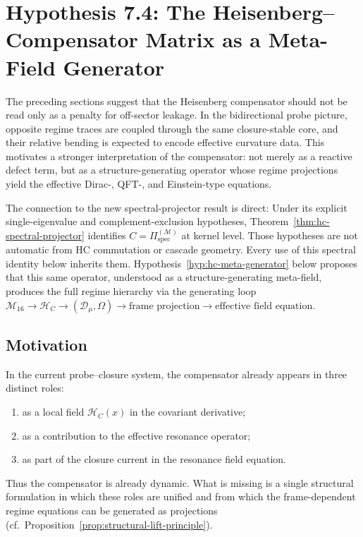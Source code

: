 \section{Hypothesis 7.4: The Heisenberg--Compensator Matrix as a Meta-Field Generator}
\label{sec:hc-meta-field-generator}

The preceding sections suggest that the Heisenberg compensator should not
be read only as a penalty for off-sector leakage. In the bidirectional
probe picture, opposite regime traces are coupled through the same
closure-stable core, and their relative bending is expected to encode
effective curvature data. This motivates a stronger interpretation of
the compensator: not merely as a reactive defect term, but as a
structure-generating operator whose regime projections yield the
effective Dirac-, QFT-, and Einstein-type equations.

The connection to the new spectral-projector result is direct:
Under its explicit single-eigenvalue and complement-exclusion hypotheses,
Theorem~\ref{thm:hc-spectral-projector} identifies
$C = \Pi^{(\mathcal{M})}_{\mathrm{spec}}$ at kernel level. Those
hypotheses are not automatic from HC commutation or cascade geometry.
Every use of this spectral identity below inherits them.
Hypothesis~\ref{hyp:hc-meta-generator} below
proposes that this same operator, understood as a structure-generating
meta-field, produces the full regime hierarchy via the generating loop
$\mathcal{M}_{16} \to \mathcal{H}_C \to (\mathcal{D}_\mu,\Omega) \to
\text{frame projection} \to \text{effective field equation}$.

\subsection*{Motivation}

In the current probe--closure system, the compensator already appears
in three distinct roles:
\begin{enumerate}[label=(\arabic*)]
  \item as a local field $\mathcal{H}_C(x)$ in the covariant derivative;
  \item as a contribution to the effective resonance operator;
  \item as part of the closure current in the resonance field equation.
\end{enumerate}
Thus the compensator is already dynamic. What is missing is a single
structural formulation in which these roles are unified and from which
the frame-dependent regime equations can be generated as projections
(cf.\ Proposition~\ref{prop:structural-lift-principle}).

